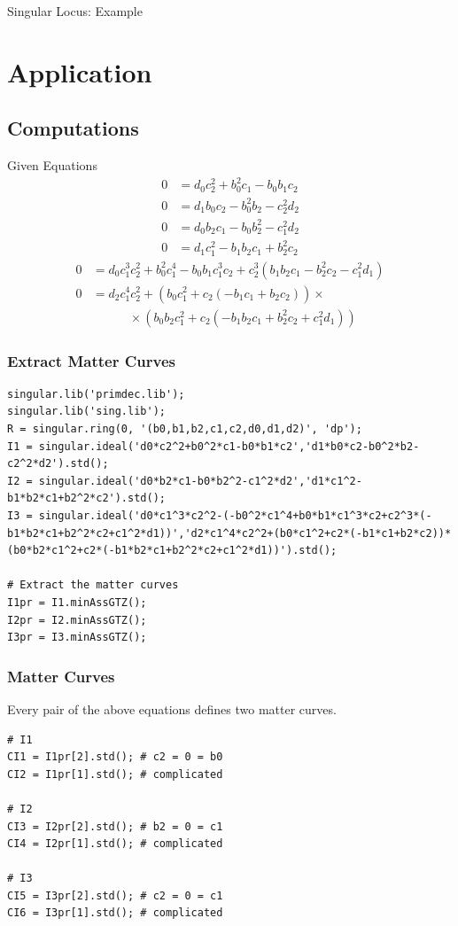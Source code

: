 \documentclass[notes=hide]{beamer}
\begin{document}
\begin{frame}{Singular Locus: Example}
\end{frame}





\section{Application}

\subsection{Computations}
\begin{frame}{Given Equations}
\begin{align*}
0&=d_0 c_2^2 + b_0^2 c_1 - b_0 b_1 c_2\\
0&=d_1 b_0 c_2 - b_0^2 b_2-c_2^2 d_2
\end{align*}
\begin{align*}
0&=d_0 b_2 c_1 - b_0 b_2^2 - c_1^2 d_2\\
0&=d_1 c_1^2 - b_1 b_2 c_1 + b_2^2 c_2
\end{align*}
\begin{align*}
0&=d_0 c_1^3 c_2^2 + b_0^2 c_1^4-b_0 b_1 c_1^3 c_2 + c_2^3 (b_1 b_2 c_1 - b_2^2 c_2 - c_1^2 d_1)\\
0&=d_2 c_1^4 c_2^2+(b_0 c_1^2+c_2 (-b_1 c_1+b_2 c_2)) \times \\&\hspace{3em} \times (b_0 b_2 c_1^2+c_2 (-b_1 b_2 c_1+b_2^2 c_2+c_1^2 d_1))
\end{align*}
\end{frame}

\begin{frame}[fragile]
\frametitle{Extract Matter Curves}
\begin{lstlisting}
singular.lib('primdec.lib');
singular.lib('sing.lib');
R = singular.ring(0, '(b0,b1,b2,c1,c2,d0,d1,d2)', 'dp');
I1 = singular.ideal('d0*c2^2+b0^2*c1-b0*b1*c2','d1*b0*c2-b0^2*b2-c2^2*d2').std();
I2 = singular.ideal('d0*b2*c1-b0*b2^2-c1^2*d2','d1*c1^2-b1*b2*c1+b2^2*c2').std();
I3 = singular.ideal('d0*c1^3*c2^2-(-b0^2*c1^4+b0*b1*c1^3*c2+c2^3*(-b1*b2*c1+b2^2*c2+c1^2*d1))','d2*c1^4*c2^2+(b0*c1^2+c2*(-b1*c1+b2*c2))*(b0*b2*c1^2+c2*(-b1*b2*c1+b2^2*c2+c1^2*d1))').std();

# Extract the matter curves
I1pr = I1.minAssGTZ();
I2pr = I2.minAssGTZ();
I3pr = I3.minAssGTZ();
\end{lstlisting}
\end{frame}

\begin{frame}[fragile]
\frametitle{Matter Curves}
Every pair of the above equations defines two matter curves.
\begin{lstlisting}
# I1
CI1 = I1pr[2].std(); # c2 = 0 = b0
CI2 = I1pr[1].std(); # complicated

# I2
CI3 = I2pr[2].std(); # b2 = 0 = c1
CI4 = I2pr[1].std(); # complicated

# I3
CI5 = I3pr[2].std(); # c2 = 0 = c1
CI6 = I3pr[1].std(); # complicated
\end{lstlisting}
\end{frame}
\end{document}
